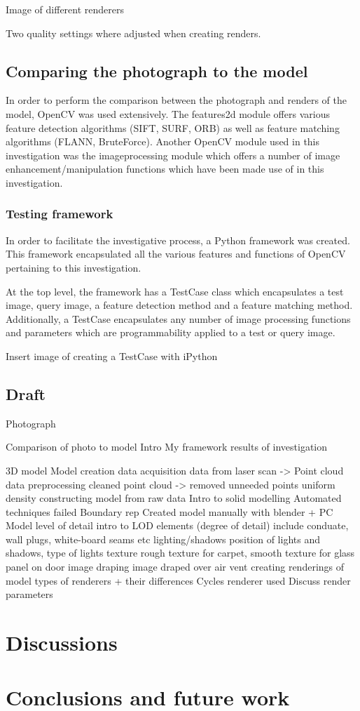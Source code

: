 \documentclass[11pt,a4paper]{report}
\begin{document}
				{{Image of different renderers}}
				
				Two quality settings where adjusted when creating renders.

	\section{Comparing the photograph to the model}
		In order to perform the comparison between the photograph and renders of the model, OpenCV was used extensively. The features2d module offers various feature detection algorithms (SIFT, SURF, ORB) as well as feature matching algorithms (FLANN, BruteForce). Another OpenCV module used in this investigation was the imageprocessing module which offers a number of image enhancement/manipulation functions which have been made use of in this investigation.
		\subsection{Testing framework}
			In order to facilitate the investigative process, a Python framework was created. This framework encapsulated all the various features and functions of OpenCV pertaining to this investigation.
			
			At the top level, the framework has a TestCase class which encapsulates a test image, query image, a feature detection method and a feature matching method. Additionally, a TestCase encapsulates any number of image processing functions and parameters which are programmability applied to a test or query image. 
			
			{{Insert image of creating a TestCase with iPython}}
	\section{Draft}
		Photograph
		
		Comparison of photo to model
			Intro
			My framework
			results of investigation
		
		3D model
			Model creation
				data acquisition
				data from laser scan -> Point cloud
			data preprocessing
				cleaned point cloud -> removed unneeded points
				uniform density
			constructing model from raw data
				Intro to solid modelling
				Automated techniques failed
				Boundary rep
				Created model manually with blender + PC
			Model level of detail
				intro to LOD
				elements (degree of detail)
					include conduate, wall plugs, white-board seams etc
				lighting/shadows
					position of lights and shadows, type of lights
				texture
					rough texture for carpet, smooth texture for glass panel on door
				image draping
					image draped over air vent
				creating renderings of model
					types of renderers + their differences
					Cycles renderer used
					Discuss render parameters
			
				

\chapter{Discussions}

\chapter{Conclusions and future work}

\newpage
\printbibliography
\end{document}
